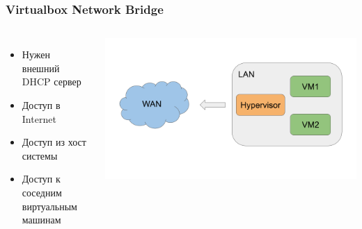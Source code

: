 \begin{frame}
\frametitle{Virtualbox Network Bridge}
	\begin{columns}
        \begin{itemize}
            \item Нужен внешний DHCP сервер
            \item Доступ в Internet
            \item Доступ из хост системы
            \item Доступ к соседним виртуальным машинам
        \end{itemize}
    \includegraphics[height=0.4\textheight]{../../slides/vbox/Virtualbox network Bridge.png}
	\end{columns}
\end{frame}
